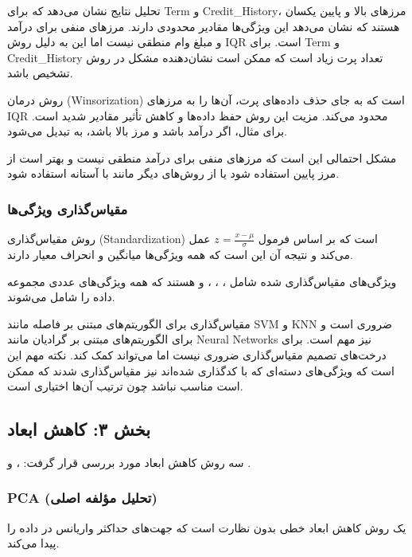 \documentclass{article}
\begin{document}
تحلیل نتایج نشان می‌دهد که برای Term و Credit\_History، مرزهای بالا و پایین یکسان هستند که نشان می‌دهد این ویژگی‌ها مقادیر محدودی دارند. مرزهای منفی برای درآمد و مبلغ وام منطقی نیست اما این به دلیل روش IQR است. برای Term و Credit\_History تعداد پرت زیاد است که ممکن است نشان‌دهنده مشکل در روش تشخیص باشد.

روش درمان  (Winsorization) است که به جای حذف داده‌های پرت، آن‌ها را به مرزهای IQR محدود می‌کند. مزیت این روش حفظ داده‌ها و کاهش تأثیر مقادیر شدید است. برای مثال، اگر درآمد  باشد و مرز بالا  باشد، به  تبدیل می‌شود.

مشکل احتمالی این است که مرزهای منفی برای درآمد منطقی نیست و بهتر است از مرز پایین  استفاده شود یا از روش‌های دیگر مانند  با آستانه  استفاده شود.

\subsubsection{مقیاس‌گذاری ویژگی‌ها}

روش مقیاس‌گذاری  (Standardization) است که بر اساس فرمول $z = \frac{x - \mu}{\sigma}$ عمل می‌کند و نتیجه آن این است که همه ویژگی‌ها میانگین  و انحراف معیار  دارند.

ویژگی‌های مقیاس‌گذاری شده شامل ، ، ،  و  هستند که همه ویژگی‌های عددی مجموعه داده را شامل می‌شوند.

مقیاس‌گذاری برای الگوریتم‌های مبتنی بر فاصله مانند SVM و KNN ضروری است و برای الگوریتم‌های مبتنی بر گرادیان مانند Neural Networks نیز مهم است. برای درخت‌های تصمیم مقیاس‌گذاری ضروری نیست اما می‌تواند کمک کند. نکته مهم این است که ویژگی‌های دسته‌ای که با  کدگذاری شده‌اند نیز مقیاس‌گذاری شدند که ممکن است مناسب نباشد چون ترتیب آن‌ها اختیاری است.

\subsection{بخش ۳: کاهش ابعاد}

سه روش کاهش ابعاد مورد بررسی قرار گرفت: ،  و .

\subsubsection{PCA (تحلیل مؤلفه اصلی)}

 یک روش کاهش ابعاد خطی بدون نظارت است که جهت‌های حداکثر واریانس در داده را پیدا می‌کند.
\end{document}
